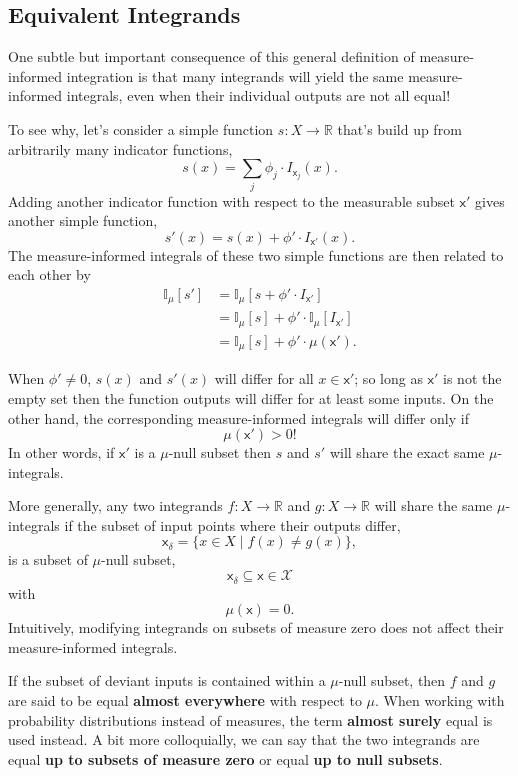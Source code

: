\documentclass[
  letterpaper,
  DIV=11,
  numbers=noendperiod]{scrartcl}
\begin{document}
\subsection{Equivalent Integrands}\label{equivalent-integrands}

One subtle but important consequence of this general definition of
measure-informed integration is that many integrands will yield the same
measure-informed integrals, even when their individual outputs are not
all equal!

To see why, let's consider a simple function
\(s: X \rightarrow \mathbb{R}\) that's build up from arbitrarily many
indicator functions, \[
s(x) = \sum_{j} \phi_{j} \cdot I_{\mathsf{x}_{j}}(x).
\] Adding another indicator function with respect to the measurable
subset \(\mathsf{x}'\) gives another simple function, \[
s'(x) = s(x) + \phi' \cdot I_{\mathsf{x}'}(x).
\] The measure-informed integrals of these two simple functions are then
related to each other by \begin{align*}
\mathbb{I}_{\mu}[s']
&=
\mathbb{I}_{\mu}[s + \phi' \cdot I_{\mathsf{x}'}]
\\
&=
\mathbb{I}_{\mu}[s]
+
\phi' \cdot \mathbb{I}_{\mu}[I_{\mathsf{x}'}]
\\
&=
\mathbb{I}_{\mu}[s] + \phi' \cdot \mu(\mathsf{x}').
\end{align*}

When \(\phi' \ne 0\), \(s(x)\) and \(s'(x)\) will differ for all
\(x \in \mathsf{x}'\); so long as \(\mathsf{x}'\) is not the empty set
then the function outputs will differ for at least some inputs. On the
other hand, the corresponding measure-informed integrals will differ
only if \[
\mu(\mathsf{x}') > 0!
\] In other words, if \(\mathsf{x}'\) is a \(\mu\)-null subset then
\(s\) and \(s'\) will share the exact same \(\mu\)-integrals.

More generally, any two integrands \(f: X \rightarrow \mathbb{R}\) and
\(g: X \rightarrow \mathbb{R}\) will share the same \(\mu\)-integrals if
the subset of input points where their outputs differ, \[
\mathsf{x}_{\delta} = \{ x \in X \mid f(x) \ne g(x) \},
\] is a subset of \(\mu\)-null subset, \[
\mathsf{x}_{\delta} \subseteq \mathsf{x} \in \mathcal{X}
\] with \[
\mu(\mathsf{x}) = 0.
\] Intuitively, modifying integrands on subsets of measure zero does not
affect their measure-informed integrals.

If the subset of deviant inputs is contained within a \(\mu\)-null
subset, then \(f\) and \(g\) are said to be equal \textbf{almost
everywhere} with respect to \(\mu\). When working with probability
distributions instead of measures, the term \textbf{almost surely} equal
is used instead. A bit more colloquially, we can say that the two
integrands are equal \textbf{up to subsets of measure zero} or equal
\textbf{up to null subsets}.
\end{document}
